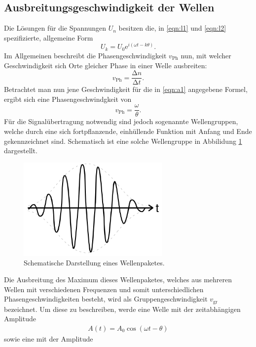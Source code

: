 \subsection{Ausbreitungsgeschwindigkeit der Wellen}
Die Lösungen für die Spannungen $U_n$ besitzen die, in \eqref{eqn:l1} und \eqref{eqn:l2} spezifizierte, allgemeine Form
\begin{equation}
  \label{eqn:a1}
  U_k = U_0 \mathrm{e}^{i(\omega t - k \theta)}.
\end{equation}
Im Allgemeinen beschreibt die Phasengeschwindigkeit $v_{\text{Ph}}$ nun, mit welcher Geschwindigkeit sich Orte gleicher Phase in einer Welle ausbreiten:
\begin{equation}
  v_{\text{Ph}} = \frac{\increment{n}}{\increment{t}}.
\end{equation}
Betrachtet man nun jene Geschwindigkeit für die in \eqref{eqn:a1} angegebene Formel, ergibt sich eine Phasengeschwindgkeit von
\begin{equation}
    \label{eqn:phase}
  v_{\text{Ph}} = \frac{\omega}{\theta}.
\end{equation}
Für die Signalübertragung notwendig sind jedoch sogenannte Wellengruppen, welche durch eine sich fortpflanzende, einhüllende Funktion mit Anfang und Ende gekennzeichnet sind.
Schematisch ist eine solche Wellengruppe in Abbilidung \ref{tfig:3} dargestellt.
\begin{figure}[H]
  \centering
  \includegraphics[height=5cm]{wellenpaket.png}
  \caption{Schematische Darstellung eines Wellenpaketes.}
  \label{tfig:3}
\end{figure}
Die Ausbreitung des Maximum dieses Wellenpaketes, welches aus mehreren Wellen mit verschiedenen Frequenzen und somit unterschiedlichen Phasengeschwindigkeiten besteht, wird als Gruppengeschwindigkeit $v_{\text{gr}}$ bezeichnet.
Um diese zu beschreiben, werde eine Welle mit der zeitabhängigen Amplitude
\begin{align*}
A(t) = A_0 \cos{(\omega t - \theta)}
\end{align*}
sowie eine mit der Amplitude
